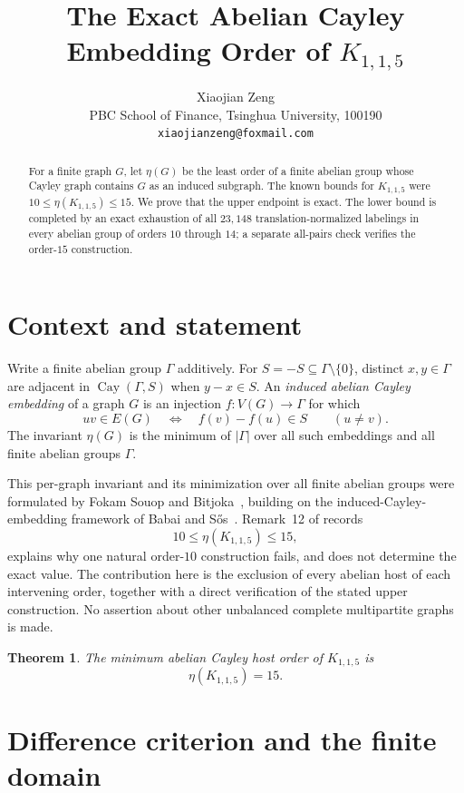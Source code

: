\documentclass[11pt]{article}
\title{The Exact Abelian Cayley Embedding Order of $K_{1,1,5}$}
\author{Xiaojian Zeng\\
PBC School of Finance, Tsinghua University, 100190\\
\texttt{xiaojianzeng@foxmail.com}}
\date{}
\newtheorem{theorem}{Theorem}
\newcommand{\Cay}{\operatorname{Cay}}
\begin{document}
\maketitle

\begin{abstract}
For a finite graph $G$, let $\eta(G)$ be the least order of a finite
abelian group whose Cayley graph contains $G$ as an induced subgraph.  The
known bounds for $K_{1,1,5}$ were $10\leq\eta(K_{1,1,5})\leq15$.  We prove
that the upper endpoint is exact.  The lower bound is completed by an exact
exhaustion of all $23{,}148$ translation-normalized labelings in every
abelian group of orders $10$ through $14$; a separate all-pairs check
verifies the order-$15$ construction.
\end{abstract}

\section{Context and statement}

Write a finite abelian group $\Gamma$ additively.  For
$S=-S\subseteq\Gamma\setminus\{0\}$, distinct $x,y\in\Gamma$ are adjacent
in $\Cay(\Gamma,S)$ when $y-x\in S$.  An \emph{induced abelian Cayley
embedding} of a graph $G$ is an injection $f:V(G)\to\Gamma$ for which
\[
 uv\in E(G) \quad\Longleftrightarrow\quad f(v)-f(u)\in S
 \qquad (u\ne v).
\]
The invariant $\eta(G)$ is the minimum of $|\Gamma|$ over all such
embeddings and all finite abelian groups $\Gamma$.

This per-graph invariant and its minimization over all finite abelian groups
were formulated by Fokam Souop and Bitjoka~\cite{FokamSouopBitjoka2026},
building on the induced-Cayley-embedding framework of Babai and
S\H{o}s~\cite{BabaiSos1985}.  Remark~12 of
\cite{FokamSouopBitjoka2026} records
\[
 10\leq\eta(K_{1,1,5})\leq15,
\]
explains why one natural order-$10$ construction fails, and does not
determine the exact value.  The contribution here is the exclusion of every
abelian host of each intervening order, together with a direct verification
of the stated upper construction.  No assertion about other unbalanced
complete multipartite graphs is made.

\begin{theorem}
\label{thm:main}
The minimum abelian Cayley host order of $K_{1,1,5}$ is
\[
 \eta(K_{1,1,5})=15.
\]
\end{theorem}

\section{Difference criterion and the finite domain}
\end{document}
